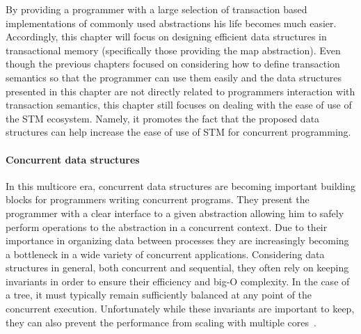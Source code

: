 By providing a programmer with a large selection of transaction based implementations of commonly used abstractions
his life becomes much easier.
Accordingly, this chapter will focus on designing efficient data structures in transactional memory (specifically those providing the map abstraction).
Even though the previous chapters focused on considering how to define transaction semantics so that the programmer can use them easily and
the data structures presented in this chapter are not directly related to programmers interaction with transaction semantics,
this chapter still focuses on dealing with the ease of use of the STM ecosystem.
Namely, it promotes the fact that the proposed data structures can help increase the ease of use of STM for concurrent programming.


\paragraph{Concurrent data structures}
In this multicore era, concurrent data structures are becoming important building blocks
for programmers writing concurrent programs.
They present the programmer with a clear interface to a given abstraction allowing
him to safely perform operations to the abstraction in a concurrent context.
Due to their importance in organizing data between processes they are increasingly becoming a bottleneck
in a wide variety of concurrent applications.
Considering data structures in general, both concurrent and sequential, they often rely on keeping invariants
in order to ensure their efficiency and big-O complexity.
In the case of a tree, it must typically remain sufficiently balanced at any point of the concurrent execution.
Unfortunately while these invariants are important to keep, they can also prevent
the performance from scaling with multiple cores~\cite{Sha2011}.

